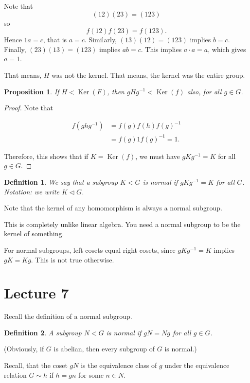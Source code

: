 \documentclass[12pt]{article}
\newtheorem*{definition}{Definition}
\newtheorem*{prop}{Proposition}
\DeclareMathOperator{\Ker}{Ker}
\begin{document}
Note that
\[
  (12)(23) = (123)
\]
so
\[
  f(1 2) f(2 3) = f(1 2 3).
\]
Hence $1a = c$, that is $a = c$.  Similarly, $(1 3)(1 2) = (1 2 3)$ implies $b = c$. Finally, $(2 3)(1 3) = (1 2 3)$ implies $a b = c$.  This implies $a \cdot a = a$, which gives $a = 1$.

That means, $H$ was not the kernel.  That means, the kernel was the entire group.

\begin{prop}
  If $H < \Ker (F)$, then $gHg^{-1} < \Ker (f)$ also, for all $g \in G$.
\end{prop}

\begin{proof}
  Note that

  \begin{align*}
    f(ghg^{-1}) & = f(g) f(h) f(g)^{-1} \\
    &= f(g) 1 f(g)^{-1} = 1.
  \end{align*}

  Therefore, this shows that if $K = \Ker (f)$, we must have $gKg^{-1} = K$ for all $g \in G$.
\end{proof}

\begin{definition}
  We say that a subgroup $K < G$ is normal if $gKg^{-1} = K$ for all $G$.  Notation: we write $K \triangleleft G$.
\end{definition}

Note that the kernel of any homomorphism is always a normal subgroup.

This is completely unlike linear algebra.  You need a normal subgroup to be the kernel of something.

For normal subgroups, left cosets equal right cosets, since $gKg^{-1} = K$ implies $gK = Kg$.  This is not true otherwise.

\section{Lecture 7}

Recall the definition of a normal subgroup. \\

\begin{definition}
  A subgroup $N < G$ is normal if $gN = Ng$ for all $g \in G$.
\end{definition}

(Obviously, if $G$ is abelian, then every subgroup of $G$ is normal.)

Recall, that the coset $gN$ is the equivalence class of $g$ under the equivalence relation $G \sim h$ if $h = gn$ for some $n \in N$.
\end{document}
